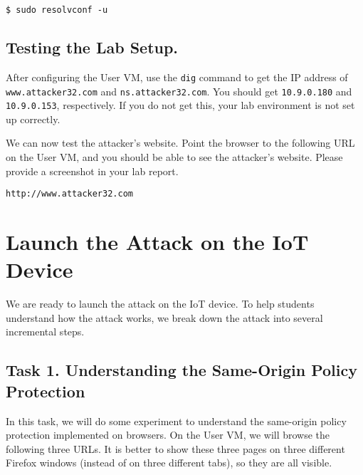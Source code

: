 \begin{lstlisting}
$ sudo resolvconf -u
\end{lstlisting}




\subsection{Testing the Lab Setup.}

After configuring the User VM, use the \texttt{dig} command
to get the IP address of \texttt{www.attacker32.com}
and \texttt{ns.attacker32.com}. You should get 
\texttt{10.9.0.180} and \texttt{10.9.0.153}, respectively. 
If you do not get this, your lab environment is not 
set up correctly. 


We can now test the attacker's website. 
Point the browser to the following URL on the User VM, and you should 
be able to see the attacker's website. 
Please provide a screenshot in your lab report. 

\begin{lstlisting}
http://www.attacker32.com
\end{lstlisting}




\section{Launch the Attack on the IoT Device}

We are ready to launch the attack on the IoT device. To help students 
understand how the attack works, we break down
the attack into several incremental steps. 


\subsection{Task 1. Understanding the Same-Origin Policy Protection}

In this task, we will do some experiment to understand the 
same-origin policy protection implemented on browsers. On the User VM,
we will browse the following three URLs. It is better to show these three pages on three
different Firefox windows (instead of on three different tabs), so they are all visible. 


